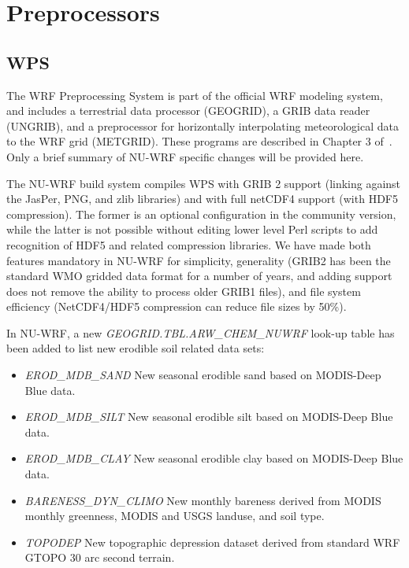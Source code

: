 \section{Preprocessors}
\label{sec:Preprocessors}

\subsection{WPS}

The WRF Preprocessing System is part of the official WRF modeling system, 
and includes a terrestrial data processor (GEOGRID), a GRIB data reader
(UNGRIB), and a preprocessor for horizontally interpolating meteorological 
data to the WRF grid (METGRID). These programs are described in Chapter 3 
of~\cite{ref:ArwUserGuide}. Only a brief summary of NU-WRF specific changes 
will be provided here.

The NU-WRF build system compiles WPS with GRIB 2 support (linking against the
JasPer, PNG, and zlib libraries) and with full netCDF4 support (with HDF5
compression). The former is an optional configuration in the community version,
while the latter is not possible without editing lower level Perl scripts
to add recognition of HDF5 and related compression libraries. We have made
both features mandatory in NU-WRF for simplicity, generality (GRIB2 has been
the standard WMO gridded data format for a number of years, and adding support
does not remove the ability to process older GRIB1 files), and file system
efficiency (NetCDF4/HDF5 compression can reduce file sizes by 50\%). 

In NU-WRF, a new \textit{GEOGRID.TBL.ARW\_CHEM\_NUWRF} look-up table has been
added to list new erodible soil related data sets:
\begin{itemize}
\item \textit{EROD\_MDB\_SAND} New seasonal erodible sand based on MODIS-Deep
Blue data.
\item \textit{EROD\_MDB\_SILT} New seasonal erodible silt based on MODIS-Deep
Blue data.
\item \textit{EROD\_MDB\_CLAY} New seasonal erodible clay based on MODIS-Deep
Blue data.
\item \textit{BARENESS\_DYN\_CLIMO} New monthly bareness derived from MODIS 
monthly greenness, MODIS and USGS landuse, and soil type.
\item \textit{TOPODEP} New topographic depression dataset derived from standard
WRF GTOPO 30 arc second terrain.
\end{itemize}

